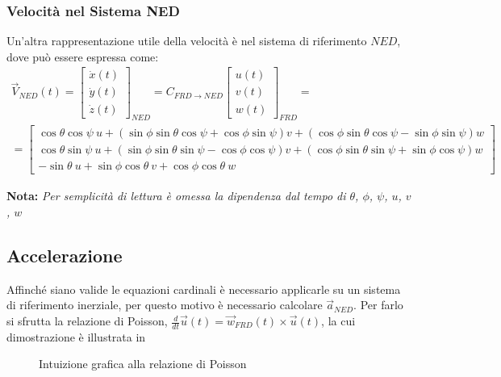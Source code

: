 \subsubsection{Velocità nel Sistema NED}
Un'altra rappresentazione utile della velocità è nel sistema di riferimento $NED$, dove può essere espressa come:
\begin{multline}
    \label{eq:velocitaNED}
    \vec{V}_{NED}(t) = \begin{bmatrix}
        \dot{x}(t) \\
        \dot{y}(t) \\
        \dot{z}(t)
    \end{bmatrix}_{NED} = C_{FRD \rightarrow NED}\begin{bmatrix}
        u(t) \\
        v(t) \\
        w(t)
    \end{bmatrix}_{FRD} = \\ = \begin{bmatrix}
        \cos\theta\cos\psi \: u + \left(\sin\phi\sin\theta\cos\psi + \cos\phi\sin\psi\right)v + \left(\cos\phi\sin\theta\cos\psi - \sin\phi\sin\psi\right)w \\
        \cos\theta\sin\psi \: u + \left(\sin\phi\sin\theta\sin\psi - \cos\phi\cos\psi\right)v + \left(\cos\phi\sin\theta\sin\psi + \sin\phi\cos\psi\right)w \\
        -\sin\theta \: u + \sin\phi\cos\theta \: v + \cos\phi\cos\theta \: w
    \end{bmatrix}
\end{multline}

\textbf{Nota:} \textit{Per semplicità di lettura è omessa la dipendenza dal tempo di $\theta$, $\phi$, $\psi$, $u$, $v$, $w$}

\subsection{Accelerazione}

Affinché siano valide le equazioni cardinali è necessario applicarle su un sistema di riferimento inerziale, per questo motivo è necessario calcolare $\vec{a}_{NED}$.
Per farlo si sfrutta la relazione di Poisson, $\frac{d}{dt}\vec{u}(t) = \vec{w}_{FRD}(t) \times \vec{u}(t)$, la cui dimostrazione è illustrata in \cite{zotto_fisica1}

\begin{figure}[H]
    \centering
    \caption{Intuizione grafica alla relazione di Poisson}
\end{figure}

